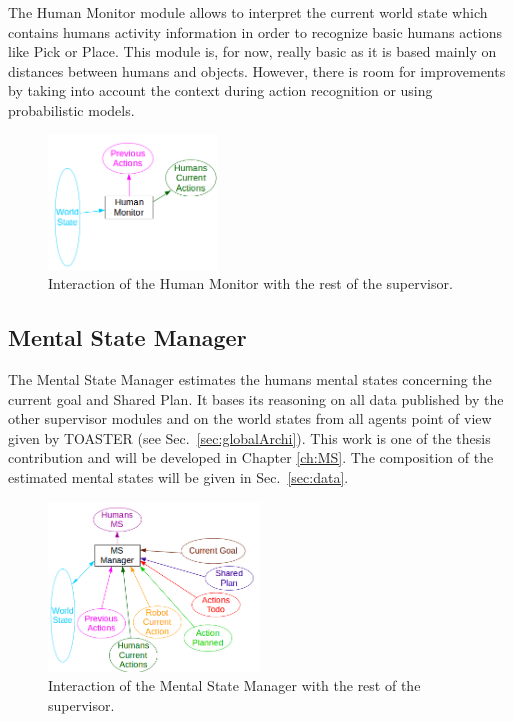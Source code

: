 \documentclass[english,a4paper,11pt,twoside]{StyleThese}
\begin{document}
The Human Monitor module allows to interpret the current world state which contains humans activity information in order to recognize basic humans actions like Pick or Place. This module is, for now, really basic as it is based mainly on distances between humans and objects. However, there is room for improvements by taking into account the context during action recognition or using probabilistic models.


\begin{figure}[!h]
	\centering
    \includegraphics[width=0.4\textwidth]{figs/Chapter2/HumanMonitor.png}
    \caption{Interaction of the Human Monitor with the rest of the supervisor.}
    \label{fig:humanMonitor}
\end{figure}

\newpage
\subsection{Mental State Manager}

The Mental State Manager estimates the humans mental states concerning the current goal and Shared Plan. It bases its reasoning on all data published by the other supervisor modules and on the world states from all agents point of view given by TOASTER (see Sec.~\ref{sec:globalArchi}). This work is one of the thesis contribution and will be developed in Chapter \ref{ch:MS}. The composition of the estimated mental states will be given in Sec.~\ref{sec:data}. 

\begin{figure}[!h]
	\centering
    \includegraphics[width=0.5\textwidth]{figs/Chapter2/MSManager.png}
    \caption{Interaction of the Mental State Manager with the rest of the supervisor.}
    \label{fig:MSManager}
\end{figure}
\end{document}
